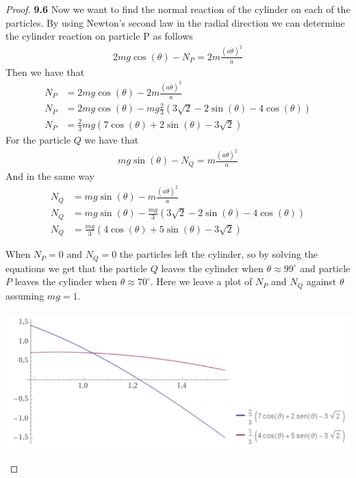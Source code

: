 \documentclass[11pt]{article}
\theoremstyle{definition}
\begin{document}
\begin{proof}{\textbf{9.6}}
        Now we want to find the normal reaction of the cylinder on each of the
        particles. By using Newton's second law in the radial direction we can
        determine the cylinder reaction on particle P as follows 
        \begin{align*}
            2mg\cos(\theta) - N_P = 2m\frac{(a\dot\theta)^2}{a}
        \end{align*}
        Then we have that
        \begin{align*}
            N_P &= 2mg\cos(\theta) - 2m\frac{(a\dot\theta)^2}{a}\\
            N_P &= 2mg\cos(\theta) - mg\frac{2}{3}\left(3\sqrt{2} - 2\sin(\theta)
            -4\cos(\theta)\right)\\
            N_P &= \frac{2}{3}mg\left(7\cos(\theta) +  2\sin(\theta) -
                3\sqrt{2}\right)
        \end{align*}
        For the particle $Q$ we have that 
        \begin{align*}
            mg\sin(\theta) - N_Q = m\frac{(a\dot\theta)^2}{a}
        \end{align*}
        And in the same way
        \begin{align*}
            N_Q &= mg\sin(\theta) - m\frac{(a\dot\theta)^2}{a}\\
            N_Q &= mg\sin(\theta) - \frac{mg}{3}\left(3\sqrt{2} - 2\sin(\theta)
            -4\cos(\theta)\right)\\
            N_Q &= \frac{mg}{3}\left(4\cos(\theta) +  5\sin(\theta) -
                3\sqrt{2}\right)
        \end{align*}

        When $N_P = 0$ and $N_Q = 0$ the particles left the cylinder, so by
        solving the equations we get that the particle $Q$ leaves the cylinder
        when $\theta \approx 99^{\circ}$ and particle $P$ leaves the cylinder 
        when $\theta \approx 70^{\circ}$. Here we leave a plot of $N_P$ and
        $N_Q$ against $\theta$ assuming $mg=1$.
        \begin{center}
            \includegraphics[scale=0.6]{ch9-6.png}
        \end{center}
    \end{proof}
\end{document}
